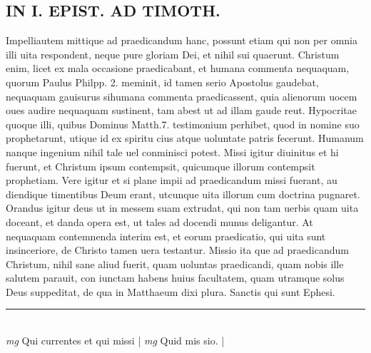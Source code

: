 \documentclass{article}
\begin{document}
\begin{pages}
\section*{IN I. EPIST. AD TIMOTH. }\pstart Impelliautem mittique ad praedicandum hanc, possunt etiam qui non per omnia illi uita respondent, neque pure gloriam Dei, et nihil sui quaerunt. Christum enim, licet ex mala occasione praedicabant, et humana commenta nequaquam, quorum Paulus Philpp. 2. meminit, id tamen serio Apostolus gaudebat, nequaquam gauisurus sihumana commenta praedicassent, quia alienorum uocem oues audire nequaquam sustinent, tam abest ut ad illam gaude reut. Hypocritae quoque illi, quibus Dominus Matth.7. testimonium perhibet, quod in nomine suo prophetarunt, utique id ex spiritu cius atque uoluntate patris fecerunt. Humanum nanque ingenium nihil tale uel conminisci potest.  Missi igitur diuinitus et hi fuerunt, et Christum ipsum contempsit, quicumque illorum contempsit prophetiam.  Vere igitur et si plane impii ad praedicandum missi fuerant, au diendique timentibus Deum erant, utcunque uita illorum cum doctrina pugnaret.   \pend\pstart Orandus igitur deus ut in messem suam extrudat, qui non tam uerbis quam uita doceant, et danda opera est, ut tales ad docendi munus deligantur. At nequaquam contemnenda interim est, et eorum praedicatio, qui uita sunt insinceriore, de Christo tamen uera testantur.  Missio ita que ad praedicandum Christum, nihil sane aliud fuerit, quam uoluntas praedicandi, quam nobis ille salutem parauit, con iunctam habens huius facultatem, quam utramque solus Deus suppeditat, de qua in Matthaeum dixi plura.  Sanctis qui sunt Ephesi.  \pend
\vspace{0.5cm}\noindent
\vspace{0.2cm}\rule{1cm}{0.2pt}\\ 
\hspace{0.2cm}\textit{mg}
\footnotesize Qui currentes et qui missi
\normalsize| 
\hspace{0.2cm}\textit{mg}
\footnotesize Quid mis sio.  
\normalsize| 

\end{pages}
\end{document}
